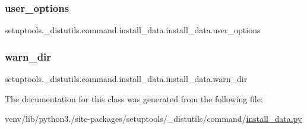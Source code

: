 \subsubsection{\texorpdfstring{user\+\_\+options}{user\_options}}
{\footnotesize\ttfamily setuptools.\+\_\+distutils.\+command.\+install\+\_\+data.\+install\+\_\+data.\+user\+\_\+options\hspace{0.3cm}{\ttfamily [static]}}

\mbox{\label{classsetuptools_1_1__distutils_1_1command_1_1install__data_1_1install__data_ab924867fbab065d8880774778ff251a9}} 
\subsubsection{\texorpdfstring{warn\+\_\+dir}{warn\_dir}}
{\footnotesize\ttfamily setuptools.\+\_\+distutils.\+command.\+install\+\_\+data.\+install\+\_\+data.\+warn\+\_\+dir}



The documentation for this class was generated from the following file\+:\begin{DoxyCompactItemize}
\item 
venv/lib/python3./site-\/packages/setuptools/\+\_\+distutils/command/\hyperlink{setuptools_2__distutils_2command_2install__data_8py}{install\+\_\+data.\+py}\end{DoxyCompactItemize}
